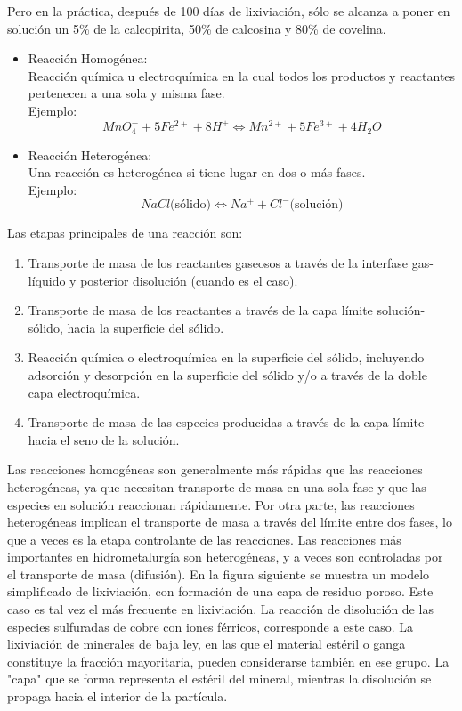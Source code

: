 Pero en la pr\'actica, despu\'es de 100 días de lixiviaci\'on, s\'olo se alcanza a poner en soluci\'on un 5\% de la calcopirita, 50\% de calcosina y 80\% de covelina.
\begin{itemize}
 \item Reacci\'on Homog\'enea:\\
 Reacci\'on qu\'imica u electroqu\'imica en la cual todos los productos y reactantes pertenecen a una sola y misma fase.\\
 Ejemplo:
 \begin{equation}
   MnO_4^- + 5 Fe^{2+} + 8 H^+ \Longleftrightarrow Mn^{2+} + 5 Fe^{3+} + 4 H_2O
 \end{equation}
 \item Reacci\'on Heterog\'enea:\\
 Una reacci\'on es heterog\'enea si tiene lugar en dos o m\'as fases.\\
 Ejemplo:
 \begin{equation}
  NaCl \text{(s\'olido)} \Longleftrightarrow Na^+ + Cl^- \text{(soluci\'on)}
 \end{equation}
\end{itemize}
Las etapas principales de una reacci\'on son:
\begin{enumerate}
 \item Transporte de masa de los reactantes gaseosos a trav\'es de la interfase gas-l\'iquido y posterior disoluci\'on (cuando es el caso).
 \item Transporte  de  masa  de  los  reactantes  a  trav\'es  de  la  capa  l\'imite soluci\'on-s\'olido, hacia la superficie del s\'olido.
 \item Reacci\'on qu\'imica o electroqu\'imica	en	la	superficie	del s\'olido, incluyendo  adsorci\'on  y  desorpci\'on  en  la  superficie  del  s\'olido  y/o  a trav\'es de la doble capa electroqu\'imica.
 \item Transporte de masa de las especies producidas a trav\'es de la capa l\'imite hacia el seno de la soluci\'on.
\end{enumerate}
Las reacciones homog\'eneas son generalmente m\'as r\'apidas que las reacciones heterog\'eneas, ya que necesitan transporte de masa en una sola fase y que las especies en soluci\'on reaccionan r\'apidamente. Por otra parte, las reacciones heterog\'eneas implican el transporte de masa a trav\'es del límite entre dos fases, lo que a veces es la etapa controlante de las reacciones. Las reacciones m\'as importantes en hidrometalurgía son heterog\'eneas, y a veces son controladas por el transporte de masa (difusi\'on).
En la figura siguiente se muestra un modelo simplificado de lixiviaci\'on, con formaci\'on de  una  capa  de  residuo  poroso.  Este  caso  es  tal  vez  el  m\'as  frecuente  en lixiviaci\'on. La reacci\'on de disoluci\'on de las especies sulfuradas de cobre con iones f\'erricos, corresponde a este caso. La lixiviaci\'on de minerales de baja ley, en las  que  el  material  est\'eril  o  ganga constituye  la  fracci\'on  mayoritaria,  pueden considerarse tambi\'en en ese grupo. La "capa" que se forma representa el est\'eril del mineral, mientras la disoluci\'on se propaga hacia el interior de la part\'icula.

